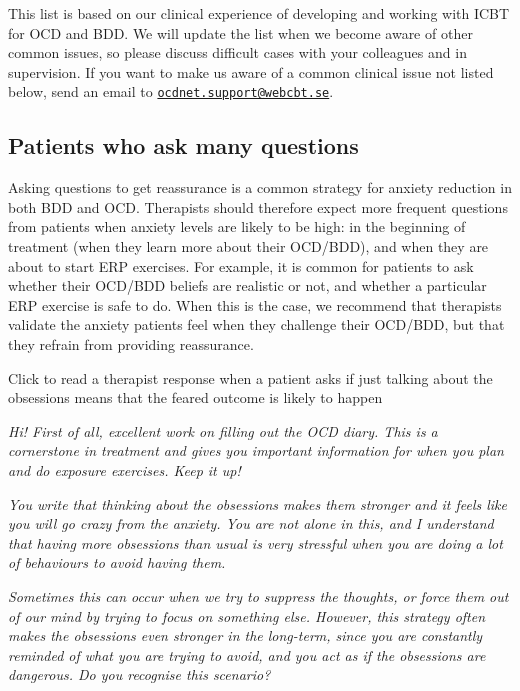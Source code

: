 \documentclass[]{book}
\begin{document}
This list is based on our clinical experience of developing and working with ICBT for OCD and BDD. We will update the list when we become aware of other common issues, so please discuss difficult cases with your colleagues and in supervision. If you want to make us aware of a common clinical issue not listed below, send an email to \href{mailto:ocdnet.support@webcbt.se}{\nolinkurl{ocdnet.support@webcbt.se}}.

\hypertarget{patients-who-ask-many-questions}{%
\subsection{Patients who ask many questions}\label{patients-who-ask-many-questions}}

Asking questions to get reassurance is a common strategy for anxiety reduction in both BDD and OCD. Therapists should therefore expect more frequent questions from patients when anxiety levels are likely to be high: in the beginning of treatment (when they learn more about their OCD/BDD), and when they are about to start ERP exercises. For example, it is common for patients to ask whether their OCD/BDD beliefs are realistic or not, and whether a particular ERP exercise is safe to do. When this is the case, we recommend that therapists validate the anxiety patients feel when they challenge their OCD/BDD, but that they refrain from providing reassurance.

Click to read a therapist response when a patient asks if just talking about the obsessions means that the feared outcome is likely to happen

\emph{Hi! First of all, excellent work on filling out the OCD diary. This is a cornerstone in treatment and gives you important information for when you plan and do exposure exercises. Keep it up!}

\emph{You write that thinking about the obsessions makes them stronger and it feels like you will go crazy from the anxiety. You are not alone in this, and I understand that having more obsessions than usual is very stressful when you are doing a lot of behaviours to avoid having them.}

\emph{Sometimes this can occur when we try to suppress the thoughts, or force them out of our mind by trying to focus on something else. However, this strategy often makes the obsessions even stronger in the long-term, since you are constantly reminded of what you are trying to avoid, and you act as if the obsessions are dangerous. Do you recognise this scenario?}
\end{document}

